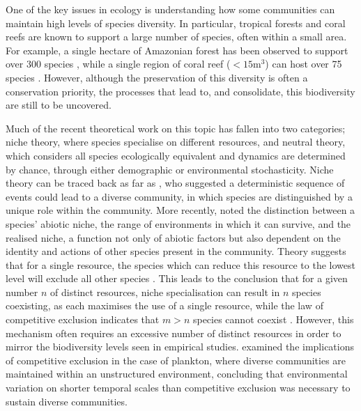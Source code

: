 One of the key issues in ecology is understanding how some communities can maintain high levels of species diversity. In particular, tropical forests and coral reefs are known to support a large number of species, often within a small area. For example, a single hectare of Amazonian forest has been observed to support over 300 species \citep{valencia1994high}, while a single region of coral reef ($<15$m$^3$) can host over 75 species \citep{smith1972space}. However, although the preservation of this diversity is often a conservation priority, the processes that lead to, and consolidate, this biodiversity are still to be uncovered.

Much of the recent theoretical work on this topic has fallen into two categories; niche theory, where species specialise on different resources, and neutral theory, which considers all species ecologically equivalent and dynamics are determined by chance, through either demographic or environmental stochasticity. Niche theory can be traced back as far as \cite{darwinorigin}, who suggested a deterministic sequence of events could lead to a diverse community, in which species are distinguished by a unique role within the community. More recently, \cite{hutchinson1957concluding} noted the distinction between a species' abiotic niche, the range of environments in which it can survive, and the realised niche, a function not only of abiotic factors but also dependent on the identity and actions of other species present in the community. Theory suggests that for a single resource, the species which can reduce this resource to the lowest level will exclude all other species \citep[e.g.][]{tilman1980resources,tilman1991dynamics}. This leads to the conclusion that for a given number $n$ of distinct resources, niche specialisation can result in $n$ species coexisting, as each maximises the use of a single resource, while the law of competitive exclusion indicates that $m>n$ species cannot coexist \citep{hardin1960competitive}. However, this mechanism often requires an excessive number of distinct resources in order to mirror the biodiversity levels seen in empirical studies. \cite{hutchinson1961paradox} examined the implications of competitive exclusion in the case of plankton, where diverse communities are maintained within an unstructured environment, concluding that environmental variation on shorter temporal scales than competitive exclusion was necessary to sustain diverse communities.

